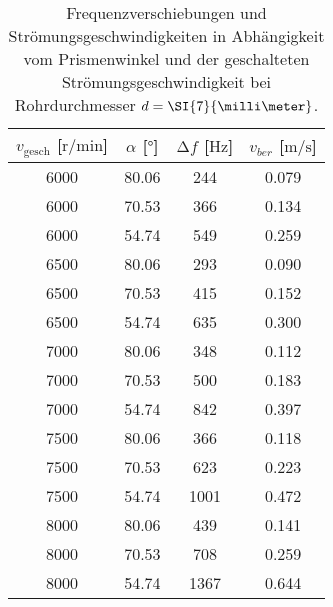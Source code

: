\begin{table}
    \centering
    \caption{Frequenzverschiebungen und Strömungsgeschwindigkeiten in Abhängigkeit vom Prismenwinkel und der geschalteten Strömungsgeschwindigkeit bei Rohrdurchmesser $\protect d = \SI{7}{\milli\meter}$.}
    \label{tab:4}
    \begin{tabular}{c c c c}
        \toprule
        $v_{\text{gesch}}$ [$\si{{\text{r}}\per\minute}$]  & $\alpha$ [$\si{\degree}$]  & $\increment f$ [$\si{\hertz}$]  &$v_{ber}$ [$\si{\meter\per\second}$] \\
        \midrule
        6000    &   80.06    & 244   & 0.079 \\ 
        6000    &   70.53    & 366   & 0.134 \\ 
        6000    &   54.74    & 549   & 0.259 \\ 
        \midrule
        6500    &   80.06   & 293    & 0.090 \\ 
        6500    &   70.53   & 415    & 0.152 \\ 
        6500    &   54.74   & 635    & 0.300 \\ 
        \midrule
        7000    &   80.06   & 348    & 0.112 \\ 
        7000    &   70.53   & 500    & 0.183 \\ 
        7000    &   54.74   & 842    & 0.397 \\ 
        \midrule
        7500    &   80.06   & 366    & 0.118 \\ 
        7500    &   70.53   & 623    & 0.223 \\ 
        7500    &   54.74   & 1001   & 0.472 \\ 
        \midrule
        8000    &   80.06   & 439    & 0.141 \\ 
        8000    &   70.53   & 708    & 0.259 \\ 
        8000    &   54.74   & 1367   & 0.644 \\ 
        \bottomrule
    \end{tabular}
\end{table}
        
